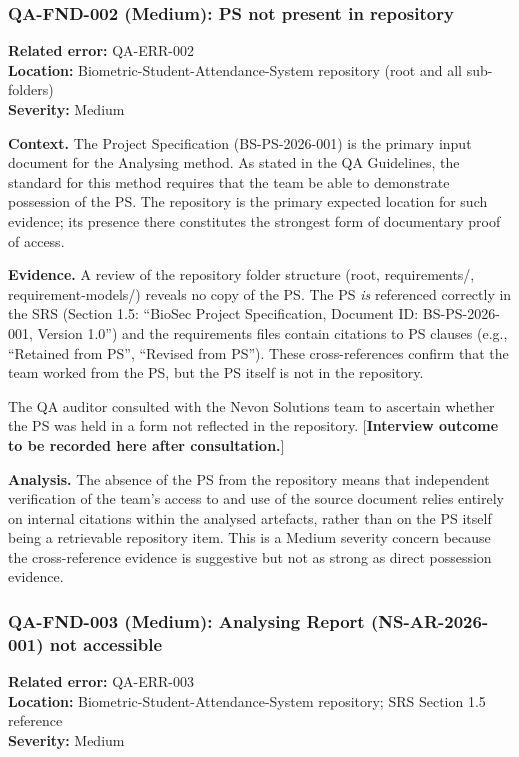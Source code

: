 \documentclass[11pt,a4paper]{article}
\begin{document}
\subsubsection*{QA-FND-002 (Medium): PS not present in repository}

\textbf{Related error:} QA-ERR-002 \\
\textbf{Location:} Biometric-Student-Attendance-System repository (root and all sub-folders) \\
\textbf{Severity:} Medium

\textbf{Context.}
The Project Specification (BS-PS-2026-001) is the primary input document for the Analysing method. As stated in the QA Guidelines, the standard for this method requires that the team be able to demonstrate possession of the PS. The repository is the primary expected location for such evidence; its presence there constitutes the strongest form of documentary proof of access.

\textbf{Evidence.}
A review of the repository folder structure (root, requirements/, requirement-models/) reveals no copy of the PS. The PS \textit{is} referenced correctly in the SRS (Section 1.5: ``BioSec Project Specification, Document ID: BS-PS-2026-001, Version 1.0'') and the requirements files contain citations to PS clauses (e.g., ``Retained from PS'', ``Revised from PS''). These cross-references confirm that the team worked from the PS, but the PS itself is not in the repository.

The QA auditor consulted with the Nevon Solutions team to ascertain whether the PS was held in a form not reflected in the repository. [\textbf{Interview outcome to be recorded here after consultation.}]

\textbf{Analysis.}
The absence of the PS from the repository means that independent verification of the team's access to and use of the source document relies entirely on internal citations within the analysed artefacts, rather than on the PS itself being a retrievable repository item. This is a Medium severity concern because the cross-reference evidence is suggestive but not as strong as direct possession evidence.

\subsubsection*{QA-FND-003 (Medium): Analysing Report (NS-AR-2026-001) not accessible}

\textbf{Related error:} QA-ERR-003 \\
\textbf{Location:} Biometric-Student-Attendance-System repository; SRS Section 1.5 reference \\
\textbf{Severity:} Medium
\end{document}
